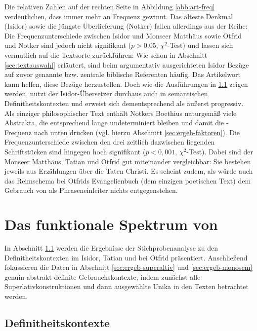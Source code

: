 Die relativen Zahlen auf der rechten Seite in Abbildung \ref{abb:art-freq} verdeutlichen, dass  immer mehr an Frequenz gewinnt.
Das älteste Denkmal (Isidor) sowie die jüngste Überlieferung (Notker) fallen allerdings aus der Reihe: Die Frequenzunterschiede zwischen Isidor und Monseer Matthäus sowie Otfrid und Notker sind jedoch nicht signifikant ($p > 0.05$, $\chi^2$-Test) und lassen sich vermutlich auf die Textsorte zurückführen: Wie schon in Abschnitt \ref{sec:textauswahl} erläutert, sind beim argumentativ ausgerichteten Isidor Bezüge auf zuvor genannte bzw. zentrale biblische Referenten häufig. Das Artikelwort  kann helfen, diese Bezüge herzustellen. Doch wie die Ausführungen in \ref{sec:ergeb-defkontexte} zeigen werden, nutzt der Isidor-Übersetzer  durchaus auch in semantischen Definitheitskontexten und erweist sich dementsprechend als äußerst progressiv. Als einziger philosophischer Text enthält Notkers Boethius naturgemäß viele Abstrakta, die entsprechend lange undeterminiert bleiben und damit die -Frequenz nach unten drücken (vgl. hierzu Abschnitt \ref{sec:ergeb-faktoren}). 
Die Frequenzunterschiede zwischen den drei zeitlich dazwischen liegenden Schriftstücken sind hingegen hoch signifikant ($p < 0,001$, $\chi^2$-Test). Dabei sind der Monseer Matthäus, Tatian und Otfrid gut miteinander vergleichbar: Sie bestehen jeweils aus Erzählungen über die Taten Christi. Es scheint zudem, als würde auch das Reimschema bei Otfrids Evangelienbuch (dem einzigen poetischen Text) dem Gebrauch von  als Phraseneinleiter nichts entgegenstehen.  

\section{Das funktionale Spektrum von }\label{sec:ergeb-definitheit}

In Abschnitt \ref{sec:ergeb-defkontexte} werden die Ergebnisse der Stichprobenanalyse zu den Definitheitskontexten im Isidor, Tatian und bei Otfrid präsentiert. Anschließend fokussieren die Daten in Abschnitt \ref{sec:ergeb-superaltiv} und \ref{sec:ergeb-monosem} genuin abstrakt-definite Gebrauchskontexte, indem zunächst alle Superlativkonstruktionen und dann ausgewählte Unika in den Texten betrachtet werden.  

\subsection{Definitheitskontexte}\label{sec:ergeb-defkontexte}

